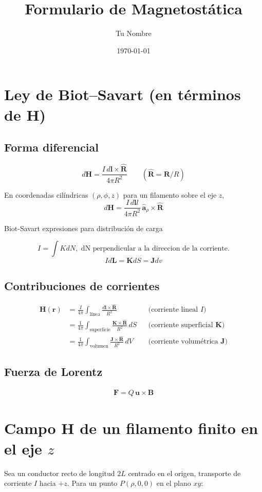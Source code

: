 \documentclass[11pt]{article}
\title{Formulario de Magnetostática}
\author{Tu Nombre}
\date{\today}
\begin{document}
\section{Ley de Biot–Savart (en términos de \(\mathbf{H}\))}
\subsection*{Forma diferencial}
\[
d\mathbf{H}
  =\frac{I\,d\mathbf{l}\times\hat{\mathbf{R}}}{4\pi R^{2}}
\qquad
(\hat{\mathbf{R}}=\mathbf{R}/R)
\]

En coordenadas cilíndricas \(({\rho},\phi,z)\) para un filamento sobre el eje \(z\),
\[
d\mathbf{H}= \frac{I\,d\mathbf{l}l}{4\pi R^{2}}
             \,\hat{\boldsymbol{a}}_{{\rho}}
             \times\hat{\mathbf{R}}
\]

Biot-Savart expresiones para distribución de carga 

\[
I=\int KdN, \text{ dN perpendicular a la direccion de la corriente.}
\]
\[ Id\mathbf{L}=\mathbf{K}dS=\mathbf{J}dv
\]


\subsection*{Contribuciones de corrientes}
\begin{align}
\mathbf{H}(\mathbf{r})
  &=\frac{I}{4\pi}\int_{\text{línea}}
      \frac{d\mathbf{l}\times\hat{\mathbf{R}}}{R^{2}}
      &&\text{(corriente lineal \(I\))}\\[6pt]
  &=\frac{1}{4\pi}\int_{\text{superficie}}
      \frac{\mathbf{K}\times\hat{\mathbf{R}}}{R^{2}}\,
      dS
      &&\text{(corriente superficial \(\mathbf{K}\))}\\[6pt]
  &=\frac{1}{4\pi}\int_{\text{volumen}}
      \frac{\mathbf{J}\times\hat{\mathbf{R}}}{R^{2}}\,
      dV
      &&\text{(corriente volumétrica \(\mathbf{J}\))}
\end{align}

\subsection*{Fuerza de Lorentz}
\begin{align}
\mathbf{F}=Q\,\mathbf{u}\times\mathbf{B}
\end{align}

\section{Campo \(\mathbf{H}\) de un filamento finito en el eje \(z\)}
Sea un conductor recto de longitud \(2L\) centrado en el origen,
transporte de corriente \(I\) hacia \(+z\).
Para un punto \(P({\rho},0,0)\) en el plano \(xy\):
\end{document}
